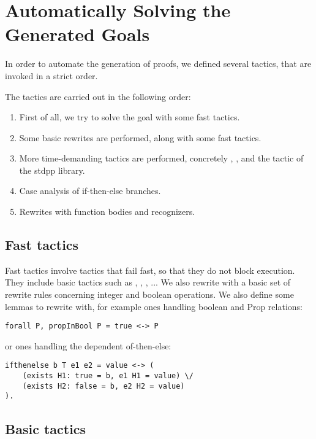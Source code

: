 \section{Automatically Solving the Generated Goals}

In order to automate the generation of proofs, we defined several tactics, that are invoked in a strict order. 

The tactics are carried out in the following order:

\begin{enumerate}
	\item First of all, we try to solve the goal with some fast tactics.
	\item Some basic rewrites are performed, along with some fast tactics.
	\item More time-demanding tactics are performed, concretely , ,  and the  tactic of the stdpp library.
	\item Case analysis of if-then-else branches.
	\item Rewrites with function bodies and recognizers.
\end{enumerate}

\subsection{Fast tactics}

Fast tactics involve tactics that fail fast, so that they do not block execution. They include basic tactics such as , , , ...
We also rewrite with a basic set of rewrite rules concerning integer and boolean operations. We also define some lemmas to rewrite with, for example ones handling boolean and Prop relations:

\begin{lstlisting}[style=myCoqstyle]
	forall P, propInBool P = true <-> P
\end{lstlisting}

or ones handling the dependent of-then-else:


\begin{lstlisting}[style=myCoqstyle]
ifthenelse b T e1 e2 = value <-> (
	(exists H1: true = b, e1 H1 = value) \/
	(exists H2: false = b, e2 H2 = value)
).
\end{lstlisting}

\subsection{Basic tactics}

